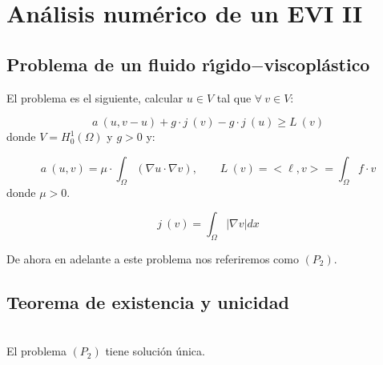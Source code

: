 %
%
%

\chapter{An\'alisis num\'erico de un EVI II}

\section{Problema de un fluido r\'{\i}gido$-$viscopl\'astico}

El problema es el siguiente, calcular $u\in V$ tal que $\forall \ v \in V$:

\begin{displaymath}
a\ (u,v-u)+g\cdot j\ (v)-g\cdot j\ (u) \ge L\ (v)
\end{displaymath}
donde $V=H^1_0(\Omega )$ y $g>0$ y:

\begin{displaymath}
a\ (u,v) =\mu \cdot \int_{\Omega} (\nabla u \cdot \nabla v),\qquad L\ (v) =
<\ell,v> = \int_{\Omega }f\cdot v
\end{displaymath}
donde $\mu >0$.

\begin{displaymath}
j\ (v) =\int_{\Omega } |\nabla v| dx
\end{displaymath}

De ahora en adelante a este problema nos referiremos como $(P_2)$.

\newpage

\section{Teorema de existencia y unicidad}

\begin{teorema}
\ \\
El problema $(P_2)$ tiene soluci\'on \'unica.
\end{teorema}

